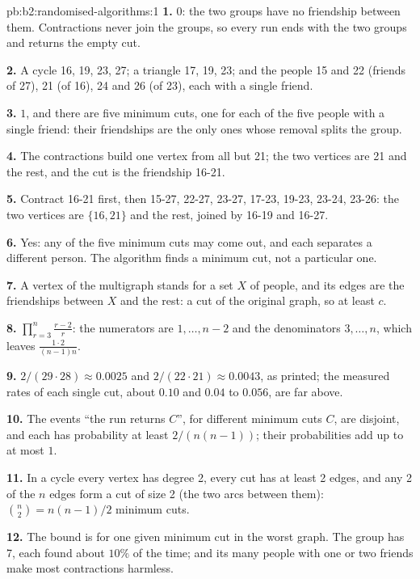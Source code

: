 \begin{solution}{pb:b2:randomised-algorithms:1}
\textbf{1.} $0$: the two groups have no friendship between them. Contractions never join the groups, so every run ends
with the two groups and returns the empty cut.

\textbf{2.} A cycle 16, 19, 23, 27; a triangle 17, 19, 23; and the people 15 and 22 (friends of 27), 21 (of 16), 24 and
26 (of 23), each with a single friend.

\textbf{3.} $1$, and there are five minimum cuts, one for each of the five people with a single friend: their
friendships are the only ones whose removal splits the group.

\textbf{4.} The contractions build one vertex from all but 21; the two vertices are 21 and the rest, and the cut is the
friendship 16-21.

\textbf{5.} Contract 16-21 first, then 15-27, 22-27, 23-27, 17-23, 19-23, 23-24, 23-26: the two vertices are $\{16,
21\}$ and the rest, joined by 16-19 and 16-27.

\textbf{6.} Yes: any of the five minimum cuts may come out, and each separates a different person. The algorithm finds a
minimum cut, not a particular one.

\textbf{7.} A vertex of the multigraph stands for a set $X$ of people, and its edges are the friendships between $X$ and
the rest: a cut of the original graph, so at least $c$.

\textbf{8.} $\prod_{r = 3}^{n} \frac{r - 2}{r}$: the numerators are $1, \dots, n - 2$ and the denominators $3, \dots, n$,
which leaves $\frac{1 \cdot 2}{(n - 1)n}$.

\textbf{9.} $2/(29 \cdot 28) \approx 0.0025$ and $2/(22 \cdot 21) \approx 0.0043$, as printed; the measured rates of each
single cut, about $0.10$ and $0.04$ to $0.056$, are far above.

\textbf{10.} The events ``the run returns $C$'', for different minimum cuts $C$, are disjoint, and each has probability
at least $2/(n(n - 1))$; their probabilities add up to at most $1$.

\textbf{11.} In a cycle every vertex has degree 2, every cut has at least 2 edges, and any 2 of the $n$ edges form a cut
of size 2 (the two arcs between them): $\binom{n}{2} = n(n - 1)/2$ minimum cuts.

\textbf{12.} The bound is for one given minimum cut in the worst graph. The group has 7, each found about $10\%$ of the
time; and its many people with one or two friends make most contractions harmless.


\end{solution}
